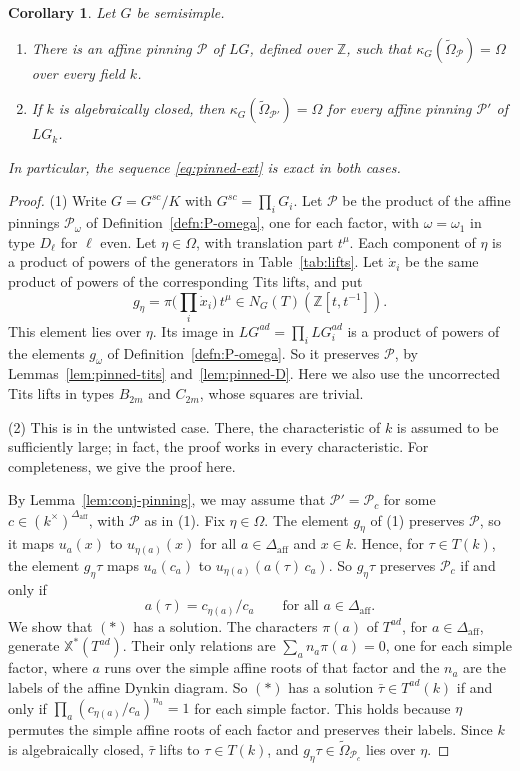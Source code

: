 \documentclass[psamsfonts]{amsart}
\newtheorem{cor}[thm]{Corollary}
\theoremstyle{definition}
\theoremstyle{remark}
\numberwithin{equation}{section}
\newcommand{\Z}{\mathbb{Z}}   %
\newcommand{\X}{\mathbb{X}}
\newcommand{\tOm}{\widetilde{\Omega}}
\DeclareMathOperator{\aff}{aff}
\newcommand\cP{\mathcal{P}}
\numberwithin{equation}{section}
\newcommand{\om}{\omega}
\newcommand{\Om}{\Omega}
\newcommand{\Daff}{\Delta_{\aff}}
\theoremstyle{plain}
\begin{document}
\begin{cor}\label{cor:surjective}
Let $G$ be semisimple.
\begin{enumerate}[(1)]
\item There is an affine pinning $\cP$ of $LG$, defined over $\Z$, such that $\kappa_G(\tOm_\cP)=\Om$ over every field $k$.
\item If $k$ is algebraically closed, then $\kappa_G(\tOm_{\cP'})=\Om$ for every affine pinning $\cP'$ of $LG_k$.
\end{enumerate}
In particular, the sequence \eqref{eq:pinned-ext} is exact in both cases.
\end{cor}

\begin{proof}
(1) Write $G=G^{sc}/K$ with $G^{sc}=\prod_iG_i$. Let $\cP$ be the product of the affine pinnings $\cP_\om$ of Definition~\ref{defn:P-omega}, one for each factor, with $\om=\om_1$ in type $D_\ell$ for $\ell$ even. Let $\eta\in\Om$, with translation part $t^{\mu}$. Each component of $\eta$ is a product of powers of the generators in Table~\ref{tab:lifts}. Let $\dot x_i$ be the same product of powers of the corresponding Tits lifts, and put
\[
g_\eta=\pi\Big(\prod_i\dot x_i\Big)\,t^{\mu}\in N_G(T)(\Z[t,t^{-1}]).
\]
This element lies over $\eta$. Its image in $LG^{ad}=\prod_iLG_i^{ad}$ is a product of powers of the elements $g_\om$ of Definition~\ref{defn:P-omega}. So it preserves $\cP$, by Lemmas~\ref{lem:pinned-tits} and~\ref{lem:pinned-D}. Here we also use the uncorrected Tits lifts in types $B_{2m}$ and $C_{2m}$, whose squares are trivial.

(2) This is \cite[Proposition~3.14]{DLYZ} in the untwisted case. There, the characteristic of $k$ is assumed to be sufficiently large; in fact, the proof works in every characteristic. For completeness, we give the proof here.

By Lemma~\ref{lem:conj-pinning}, we may assume that $\cP'=\cP_c$ for some $c\in(k^\times)^{\Daff}$, with $\cP$ as in (1). Fix $\eta\in\Om$. The element $g_\eta$ of (1) preserves $\cP$, so it maps $u_a(x)$ to $u_{\eta(a)}(x)$ for all $a\in\Daff$ and $x\in k$. Hence, for $\tau\in T(k)$, the element $g_\eta\tau$ maps $u_a(c_a)$ to $u_{\eta(a)}(a(\tau)\,c_a)$. So $g_\eta\tau$ preserves $\cP_c$ if and only if
\[
a(\tau)=c_{\eta(a)}/c_a\qquad\text{for all }a\in\Daff.\tag{$*$}
\]
We show that $(*)$ has a solution. The characters $\pi(a)$ of $T^{ad}$, for $a\in\Daff$, generate $\X^*(T^{ad})$. Their only relations are $\sum_an_a\pi(a)=0$, one for each simple factor, where $a$ runs over the simple affine roots of that factor and the $n_a$ are the labels of the affine Dynkin diagram. So $(*)$ has a solution $\bar\tau\in T^{ad}(k)$ if and only if $\prod_a(c_{\eta(a)}/c_a)^{n_a}=1$ for each simple factor. This holds because $\eta$ permutes the simple affine roots of each factor and preserves their labels. Since $k$ is algebraically closed, $\bar\tau$ lifts to $\tau\in T(k)$, and $g_\eta\tau\in\tOm_{\cP_c}$ lies over $\eta$.
\end{proof}
\end{document}
